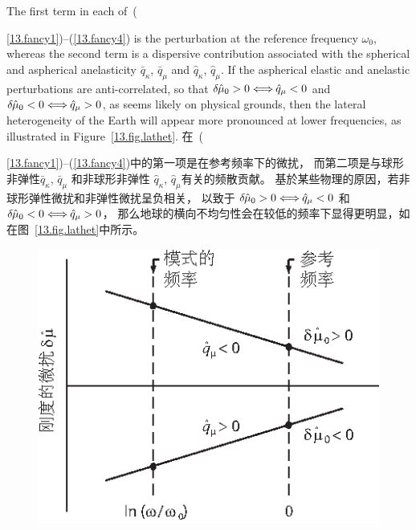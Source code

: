The first term in each of~({\ref{13.fancy1})--(\ref{13.fancy4})
is the perturbation at the reference frequency $\omega_0$,
whereas the second term is a dispersive contribution associated
with the spherical and aspherical anelasticity
$\bar{q}_{\kappa}$, $\bar{q}_{\mu}$
and $\hat{q}_{\kappa}$, $\hat{q}_{\mu}$.
If the aspherical elastic and anelastic
perturbations are anti-correlated, so that
$\delta\hspace{-0.2 mm}\hat{\mu}_0
>0\Longleftrightarrow\hspace{-0.2 mm}\hat{q}_{\mu}<0$ and
$\delta\hspace{-0.2 mm}\hat{\mu}_0
<0\Longleftrightarrow\hspace{-0.2 mm}\hat{q}_{\mu}>0$,
as seems likely on physical grounds,
then the lateral heterogeneity of the Earth will
appear more pronounced at lower frequencies, as illustrated
in Figure~\ref{13.fig.lathet}.
\fi
在~({\ref{13.fancy1})--(\ref{13.fancy4})中的第一项是在参考频率下的微扰，
而第二项是与球形非弹性$\bar{q}_{\kappa}$, $\bar{q}_{\mu}$
和非球形非弹性 $\hat{q}_{\kappa}$, $\hat{q}_{\mu}$有关的频散贡献。
基於某些物理的原因，若非球形弹性微扰和非弹性微扰呈负相关，
以致于
$\delta\hspace{-0.2 mm}\hat{\mu}_0
>0\Longleftrightarrow\hspace{-0.2 mm}\hat{q}_{\mu}<0$ 和
$\delta\hspace{-0.2 mm}\hat{\mu}_0
<0\Longleftrightarrow\hspace{-0.2 mm}\hat{q}_{\mu}>0$，
那么地球的横向不均匀性会在较低的频率下显得更明显，如在图~\ref{13.fig.lathet}中所示。
\begin{figure}[!b]
\begin{center}
\includegraphics{../figures/chap13/fig01.eps}

\end{center}
\end{figure}}}
